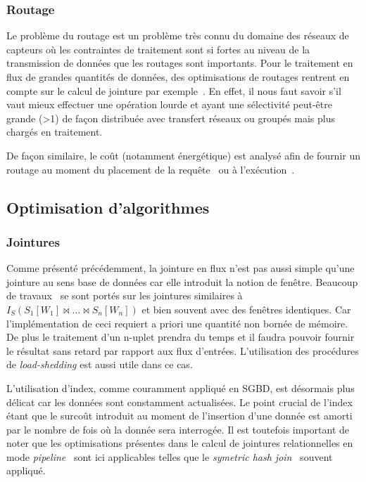\subsubsection{Routage}
Le problème du routage est un problème très connu du domaine des réseaux de capteurs où les contraintes de traitement sont si fortes au niveau de la transmission de données que les routages sont importants. Pour le traitement en flux de grandes quantités de données, des optimisations de routages rentrent en compte sur le calcul de jointure par exemple~\cite{Zhou:pmjoin}. En effet, il nous faut savoir s'il vaut mieux effectuer une opération lourde et ayant une sélectivité peut-être grande (>1) de façon distribuée avec transfert réseaux ou groupés mais plus chargés en traitement. 

De façon similaire, le coût (notamment énergétique) est analysé afin de fournir un routage au moment du placement de la requête~\cite{Galpin:snee} ou à l'exécution~\cite{Madden:tinydb}.

\subsection{Optimisation d'algorithmes}

\subsubsection{Jointures}
Comme présenté précédemment, la jointure en flux n'est pas aussi simple qu'une jointure au sens base de données car elle introduit la notion de fenêtre. Beaucoup de travaux~\cite{Han:join, Srivastava:join, Law:join} se sont portés sur les jointures similaires à $I_S (S_1[W_1] \Join ... \Join S_n[W_n])$ et bien souvent avec des fenêtres identiques. Car l'implémentation de ceci requiert a priori une quantité non bornée de mémoire. De plus le traitement d'un n-uplet prendra du temps et il faudra pouvoir fournir le résultat sans retard par rapport aux flux d'entrées. L'utilisation des procédures de \textit{load-shedding} est aussi utile dans ce cas.

L'utilisation d'index, comme couramment appliqué en SGBD, est désormais plus délicat car les données sont constamment actualisées. Le point crucial de l'index étant que le surcoût introduit au moment de l'insertion d'une donnée est amorti par le nombre de fois où la donnée sera interrogée. Il est toutefois important de noter que les optimisations présentes dans le calcul de jointures relationnelles en mode \textit{pipeline}~\cite{Gajski:pipeline} sont ici applicables telles que le \textit{symetric hash join}~\cite{Wilschut:symetricjoin} souvent appliqué.


